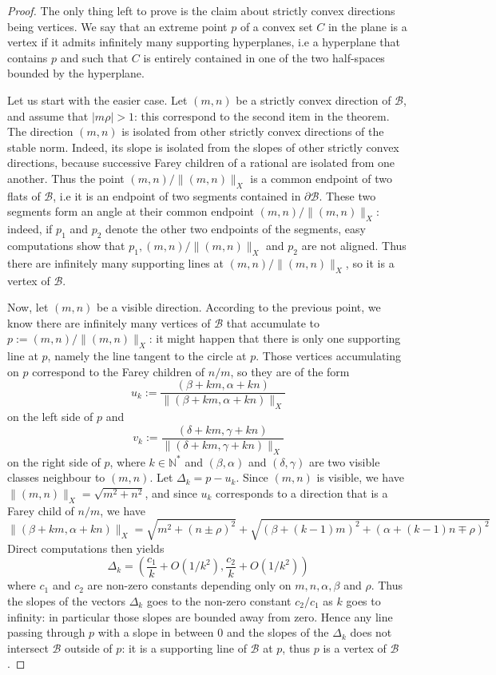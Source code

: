 \documentclass{article}
\newcommand{\NN}{\mathbb{N}}
\newcommand{\Bb}{\mathcal{B}}
\newcommand{\St}[1]{\|#1\|_X}
\theoremstyle{definition}
\begin{document}
\begin{proof}
    The only thing left to prove is the claim about strictly convex directions being vertices. We say that an extreme point $p$ of a convex set $C$ in the plane is a vertex if it admits infinitely many supporting hyperplanes, i.e a hyperplane that contains $p$ and such that $C$ is entirely contained in one of the two half-spaces bounded by the hyperplane. \newline 

   Let us start with the easier case. Let $(m,n)$ be a strictly convex direction of $\Bb$, and assume that $|m\rho| > 1$: this correspond to the second item in the theorem.  The direction $(m,n)$ is isolated from other strictly convex directions of the stable norm. Indeed, its slope is isolated from the slopes of other strictly convex directions, because successive Farey children of a rational are isolated from one another. Thus the point $(m,n) / \St{(m,n)}$ is a common endpoint of two flats of $\Bb$, i.e it is an endpoint of two segments contained in $\partial \Bb$. These two segments form an angle at their common endpoint $(m,n) / \St{(m,n)}$: indeed, if $p_1$ and $p_2$ denote the other two endpoints of the segments, easy computations show that $p_1, (m,n) / \St{(m,n)}$ and $p_2$ are not aligned. Thus there are infinitely many supporting lines at $(m,n) / \St{(m,n)}$, so it is a vertex of $\Bb$. \newline 

   Now, let $(m,n)$ be a visible direction. According to the previous point, we know there are infinitely many vertices of $\Bb$ that accumulate to $p:= (m,n) / \St{(m,n)}$: it might happen that there is only one supporting line at $p$, namely the line tangent to the circle at $p$. Those vertices accumulating on $p$ correspond to the Farey children of $n/m$, so they are of the form 
   $$u_k:= \frac{(\beta +km, \alpha + kn)}{\St{(\beta +km, \alpha + kn)}}$$
   on the left side of $p$ and 
   $$v_k:= \frac{(\delta +km, \gamma + kn)}{\St{(\delta +km, \gamma + kn)}}$$ on the right side of $p$, 
   where $k\in \NN^*$ and $(\beta,\alpha)$ and $(\delta,\gamma)$ are two visible classes neighbour to $(m,n)$. Let $\Delta_k = p - u_k$. Since $(m,n)$ is visible, we have $\St{(m,n)} = \sqrt{m^2 + n^2}$, and since $u_k$ corresponds to a direction that is a Farey child of $n/m$, we have
   $$\St{(\beta +km, \alpha + kn)} = \sqrt{ m^2 + (n \pm \rho)^2} + \sqrt{ (\beta + (k-1)m)^2 + (\alpha + (k-1)n \mp \rho)^2}$$
Direct computations then yields 
   $$\Delta_k = (\frac{c_1}{k} + O(1/k^2) , \frac{c_2}{k} + O(1/k^2))$$
   where $c_1$ and $c_2$ are non-zero constants depending only on $m,n,\alpha, \beta $ and $\rho$. Thus the slopes of the vectors $\Delta_k$ goes to the non-zero constant $c_2/c_1$ as $k$ goes to infinity: in particular those slopes are bounded away from zero. Hence any line passing through $p$ with a slope in between $0$ and the slopes of the $\Delta_k$ does not intersect $\Bb$ outside of $p$: it is a supporting line of $\Bb$ at $p$, thus $p$ is a vertex of $\Bb$.



\end{proof}
\end{document}

